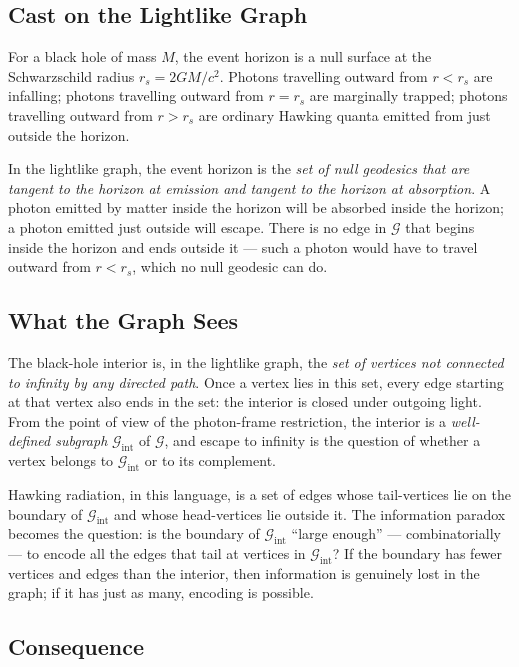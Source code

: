 \documentclass[11pt]{article}
\begin{document}
\subsection{Cast on the Lightlike Graph}

For a black hole of mass $M$, the event horizon is a null surface at the Schwarzschild radius $r_s = 2GM/c^2$. Photons travelling outward from $r < r_s$ are infalling; photons travelling outward from $r = r_s$ are marginally trapped; photons travelling outward from $r > r_s$ are ordinary Hawking quanta emitted from just outside the horizon.

In the lightlike graph, the event horizon is the \emph{set of null geodesics that are tangent to the horizon at emission and tangent to the horizon at absorption}. A photon emitted by matter inside the horizon will be absorbed inside the horizon; a photon emitted just outside will escape. There is no edge in $\mathcal{G}$ that begins inside the horizon and ends outside it --- such a photon would have to travel outward from $r < r_s$, which no null geodesic can do.

\subsection{What the Graph Sees}

The black-hole interior is, in the lightlike graph, the \emph{set of vertices not connected to infinity by any directed path}. Once a vertex lies in this set, every edge starting at that vertex also ends in the set: the interior is closed under outgoing light. From the point of view of the photon-frame restriction, the interior is a \emph{well-defined subgraph} $\mathcal{G}_{\mathrm{int}}$ of $\mathcal{G}$, and escape to infinity is the question of whether a vertex belongs to $\mathcal{G}_{\mathrm{int}}$ or to its complement.

Hawking radiation, in this language, is a set of edges whose tail-vertices lie on the boundary of $\mathcal{G}_{\mathrm{int}}$ and whose head-vertices lie outside it. The information paradox becomes the question: is the boundary of $\mathcal{G}_{\mathrm{int}}$ ``large enough'' --- combinatorially --- to encode all the edges that tail at vertices in $\mathcal{G}_{\mathrm{int}}$? If the boundary has fewer vertices and edges than the interior, then information is genuinely lost in the graph; if it has just as many, encoding is possible.

\subsection{Consequence}
\end{document}
